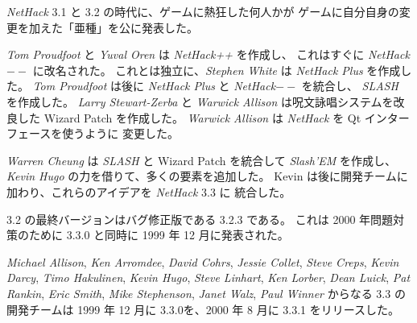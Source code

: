 \medskip
{\it NetHack\/} 3.1 と 3.2 の時代に、ゲームに熱狂した何人かが
ゲームに自分自身の変更を加えた「亜種」を公に発表した。

\medskip
{\it Tom Proudfoot} と {\it Yuval Oren} は {\it NetHack++} を作成し、
これはすぐに {\it NetHack$--$} に改名された。
これとは独立に、{\it Stephen White} は {\it NetHack Plus} を作成した。
{\it Tom Proudfoot} は後に {\it NetHack Plus} と {\it NetHack$--$} を統合し、
{\it SLASH} を作成した。
{\it Larry Stewart-Zerba} と {\it Warwick Allison} は呪文詠唱システムを改良した
Wizard Patch を作成した。
{\it Warwick Allison} は {\it NetHack\/} を Qt インターフェースを使うように
変更した。

\medskip
{\it Warren Cheung} は {\it SLASH} と Wizard Patch を統合して {\it Slash'EM\/} を作成し、
{\it Kevin Hugo} の力を借りて、多くの要素を追加した。
Kevin は後に開発チームに加わり、これらのアイデアを {\it NetHack\/} 3.3 に
統合した。

\medskip
3.2 の最終バージョンはバグ修正版である 3.2.3 である。
これは 2000 年問題対策のために 3.3.0 と同時に 1999 年 12 月に発表された。

\medskip
{\it Michael Allison}, {\it Ken Arromdee},
{\it David Cohrs}, {\it Jessie Collet}, {\it Steve Creps}, {\it Kevin Darcy},
{\it Timo Hakulinen}, {\it Kevin Hugo}, {\it Steve Linhart}, {\it Ken Lorber},
{\it Dean Luick}, {\it Pat Rankin}, {\it Eric Smith}, {\it Mike Stephenson},
{\it Janet Walz}, {\it Paul Winner} からなる 3.3 の開発チームは
1999 年 12 月に 3.3.0を、2000 年 8 月に 3.3.1 をリリースした。

